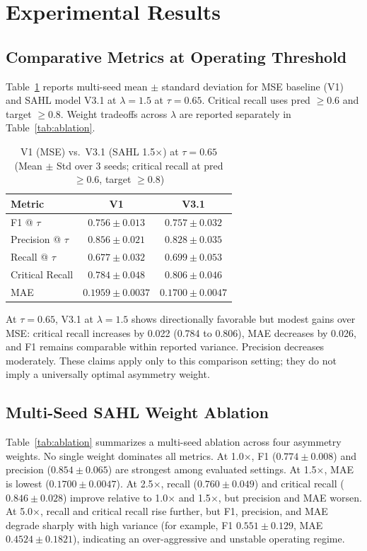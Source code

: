 \documentclass[journal]{IEEEtran}
\begin{document}
\section{Experimental Results}\label{sec:results}

\subsection{Comparative Metrics at Operating Threshold}
Table~\ref{tab:metrics} reports multi-seed mean $\pm$ standard deviation for MSE baseline (V1) and SAHL model V3.1 at $\lambda=1.5$ at $\tau=0.65$. Critical recall uses pred $\ge 0.6$ and target $\ge 0.8$. Weight tradeoffs across $\lambda$ are reported separately in Table~\ref{tab:ablation}.

\begin{table}[!t]
\centering
\caption{V1 (MSE) vs.\ V3.1 (SAHL 1.5$\times$) at $\tau=0.65$ (Mean $\pm$ Std over 3 seeds; critical recall at pred $\ge 0.6$, target $\ge 0.8$)}
\label{tab:metrics}
\begin{tabular}{lcc}
\toprule
Metric & V1 & V3.1 \\
\midrule
F1 @ $\tau$ & $0.756 \pm 0.013$ & $0.757 \pm 0.032$ \\
Precision @ $\tau$ & $0.856 \pm 0.021$ & $0.828 \pm 0.035$ \\
Recall @ $\tau$ & $0.677 \pm 0.032$ & $0.699 \pm 0.053$ \\
Critical Recall & $0.784 \pm 0.048$ & $0.806 \pm 0.046$ \\
MAE & $0.1959 \pm 0.0037$ & $0.1700 \pm 0.0047$ \\
\bottomrule
\end{tabular}
\end{table}

At $\tau=0.65$, V3.1 at $\lambda=1.5$ shows directionally favorable but modest gains over MSE: critical recall increases by 0.022 (0.784 to 0.806), MAE decreases by 0.026, and F1 remains comparable within reported variance. Precision decreases moderately. These claims apply only to this comparison setting; they do not imply a universally optimal asymmetry weight.

\subsection{Multi-Seed SAHL Weight Ablation}
Table~\ref{tab:ablation} summarizes a multi-seed ablation across four asymmetry weights. No single weight dominates all metrics. At 1.0$\times$, F1 ($0.774 \pm 0.008$) and precision ($0.854 \pm 0.065$) are strongest among evaluated settings. At 1.5$\times$, MAE is lowest ($0.1700 \pm 0.0047$). At 2.5$\times$, recall ($0.760 \pm 0.049$) and critical recall ($0.846 \pm 0.028$) improve relative to 1.0$\times$ and 1.5$\times$, but precision and MAE worsen. At 5.0$\times$, recall and critical recall rise further, but F1, precision, and MAE degrade sharply with high variance (for example, F1 $0.551 \pm 0.129$, MAE $0.4524 \pm 0.1821$), indicating an over-aggressive and unstable operating regime.
\end{document}
